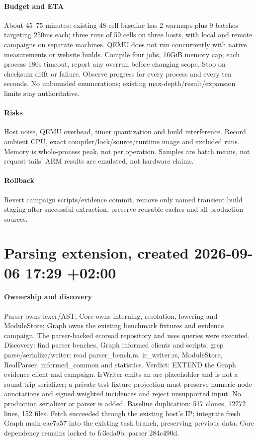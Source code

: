 \documentclass{article}
\begin{document}
\paragraph{Budget and ETA} About 45--75 minutes: existing 48-cell baseline has 2 warmups plus 9 batches targeting 250ms each; three runs of 59 cells on three hosts, with local and remote campaigns on separate machines. QEMU does not run concurrently with native measurements or website builds. Compile four jobs, 16GiB memory cap; each process 180s timeout, report any overrun before changing scope. Stop on checksum drift or failure. Observe progress for every process and every ten seconds. No unbounded enumerations; existing max-depth/result/expansion limits stay authoritative.
\paragraph{Risks} Host noise, QEMU overhead, timer quantization and build interference. Record ambient CPU, exact compiler/lock/source/runtime image and excluded runs. Memory is whole-process peak, not per operation. Samples are batch means, not request tails. ARM results are emulated, not hardware claims.
\paragraph{Rollback} Revert campaign scripts/evidence commit, remove only named transient build staging after successful extraction, preserve reusable caches and all production sources.



\section*{Parsing extension, created 2026-09-06 17:29 +02:00}
\paragraph{Ownership and discovery} Parser owns lexer/AST; Core owns interning,
resolution, lowering and ModuleStore; Graph owns the existing benchmark fixtures
and evidence campaign. The parser-backed ecoread repository and uses queries were
executed. Discovery: find parser benches, Graph informed clients and scripts;
grep parse/serialize/writer; read parser\_bench.rs, ir\_writer.rs,
ModuleStore, RealParser, informed\_common and statistics. Verdict: EXTEND the
Graph evidence client and campaign. IrWriter emits an arc placeholder and is not
a round-trip serializer; a private test fixture projection must preserve numeric
node annotations and signed weighted incidences and reject unsupported input.
No production serializer or parser is added. Baseline duplication: 517 clones,
12272 lines, 152 files. Fetch succeeded through the existing host's IP; integrate
fresh Graph main eae7a57 into the existing task branch, preserving previous data.
Core dependency remains locked to fc3eda9b; parser 284c490d.
\end{document}
